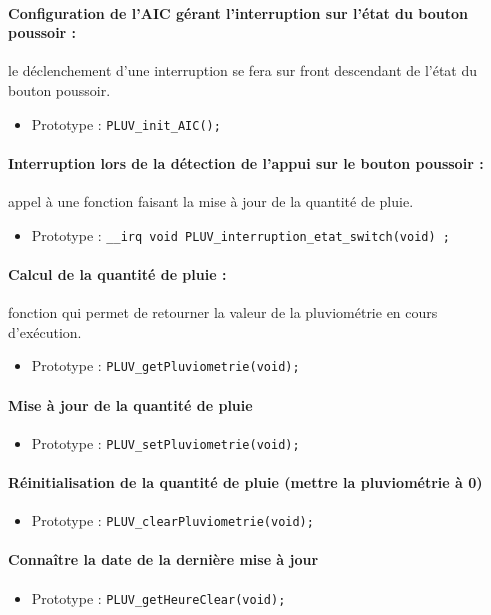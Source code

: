 \documentclass[a4paper]{report}
\begin{document}
\paragraph{Configuration de l’AIC gérant l’interruption sur l’état du bouton poussoir :}
le déclenchement d’une interruption se fera sur front descendant de l’état du bouton poussoir.
\begin{itemize}
\item Prototype : \texttt{PLUV\_init\_AIC();}
\end{itemize}
\paragraph{Interruption lors de la détection de l’appui sur le bouton poussoir :}
appel à une fonction faisant la mise à jour de la quantité de pluie.
\begin{itemize}
\item Prototype : \texttt{\_\_irq void PLUV\_interruption\_etat\_switch(void) ;}
\end{itemize}
\paragraph{Calcul de la quantité de pluie :}
fonction qui permet de retourner la valeur de la pluviométrie en cours d’exécution.
\begin{itemize}
\item Prototype : \texttt{PLUV\_getPluviometrie(void);}
\end{itemize}
\paragraph{Mise à jour de la quantité de pluie}
\begin{itemize}
\item Prototype : \texttt{PLUV\_setPluviometrie(void);}
\end{itemize}
\paragraph{Réinitialisation de la quantité de pluie (mettre la pluviométrie à 0)}
\begin{itemize}
\item Prototype : \texttt{PLUV\_clearPluviometrie(void);}
\end{itemize}
\paragraph{Connaître la date de la dernière mise à jour}
\begin{itemize}
\item Prototype : \texttt{PLUV\_getHeureClear(void);}
\end{itemize}
\end{document}
